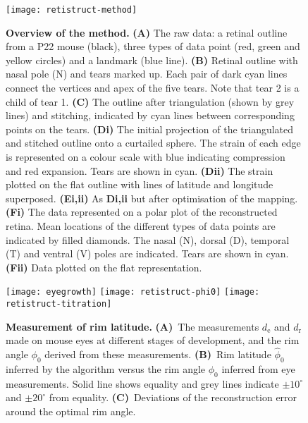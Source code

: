 \documentclass[10pt]{article}
\begin{document}
\begin{figure}[!ht]
  \texttt{[image: retistruct-method]}
  \caption{\textbf{Overview of the method.} \textbf{(A)} The raw data:
    a retinal outline from a P22 mouse (black), three types of data
    point (red, green and yellow circles) and a landmark (blue
    line). \textbf{(B)} Retinal outline with nasal pole (N) and tears
    marked up. Each pair of dark cyan lines connect the vertices and
    apex of the five tears. Note that tear 2 is a child of tear
    1. \textbf{(C)} The outline after triangulation (shown by grey
    lines) and stitching, indicated by cyan lines between
    corresponding points on the tears.  \textbf{(Di)} The initial
    projection of the triangulated and stitched outline onto a
    curtailed sphere. The strain of each edge is represented on a
    colour scale with blue indicating compression and red
    expansion. Tears are shown in cyan. \textbf{(Dii)} The strain
    plotted on the flat outline with lines of latitude and longitude
    superposed. \textbf{(Ei,ii)} As \textbf{Di,ii} but after
    optimisation of the mapping. \textbf{(Fi)} The data represented on
    a polar plot of the reconstructed retina. Mean locations of the
    different types of data points are indicated by filled
    diamonds. The nasal (N), dorsal (D), temporal (T) and ventral (V)
    poles are indicated. Tears are shown in cyan. \textbf{(Fii)} Data
    plotted on the flat representation.
    }
  \label{fold-sphere:fig:method}
\end{figure}
\begin{figure}[!ht]
  \centering
  \texttt{[image: eyegrowth]}
  \texttt{[image: retistruct-phi0]}
  \texttt{[image: retistruct-titration]}
  \caption{\textbf{Measurement of rim latitude.} \textbf{(A)}~The
    measurements $d_{\mathrm{e}}$ and $d_{\mathrm{r}}$ made on mouse eyes
    at different stages of development, and the rim angle $\phi_0$
    derived from these measurements. \textbf{(B)}~Rim latitude
    $\hat{\phi}_0$ inferred by the algorithm versus the rim angle
    $\phi_0$ inferred from eye measurements. Solid line shows equality
    and grey lines indicate $\pm10^\circ$ and $\pm20^\circ$ from
    equality. \textbf{(C)}~Deviations of the reconstruction error
    around the optimal rim angle. }
  \label{retistruct_plos:fig:eyegrowth}
\end{figure}
\end{document}
